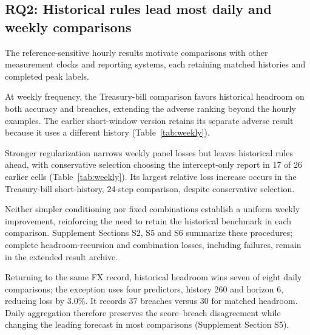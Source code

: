 \documentclass[11pt,a4paper]{article}
\begin{document}
\subsection{RQ2: Historical rules lead most daily and weekly comparisons}

The reference-sensitive hourly results motivate comparisons with other measurement clocks and reporting systems, each retaining matched histories and completed peak labels.

At weekly frequency, the Treasury-bill comparison favors historical headroom on both accuracy and breaches, extending the adverse ranking beyond the hourly examples. The earlier short-window version retains its separate adverse result because it uses a different history (Table~\ref{tab:weekly}).

Stronger regularization narrows weekly panel losses but leaves historical rules ahead, with conservative selection choosing the intercept-only report in 17 of 26 earlier cells (Table~\ref{tab:weekly}). Its largest relative loss increase occurs in the Treasury-bill short-history, 24-step comparison, despite conservative selection.

Neither simpler conditioning nor fixed combinations establish a uniform weekly improvement, reinforcing the need to retain the historical benchmark in each comparison. Supplement Sections S2, S5 and S6 summarize these procedures; complete headroom-recursion and combination losses, including failures, remain in the extended result archive.

Returning to the same FX record, historical headroom wins seven of eight daily comparisons; the exception uses four predictors, history 260 and horizon 6, reducing loss by 3.0\%. It records 37 breaches versus 30 for matched headroom. Daily aggregation therefore preserves the score--breach disagreement while changing the leading forecast in most comparisons (Supplement Section S5).
\end{document}

